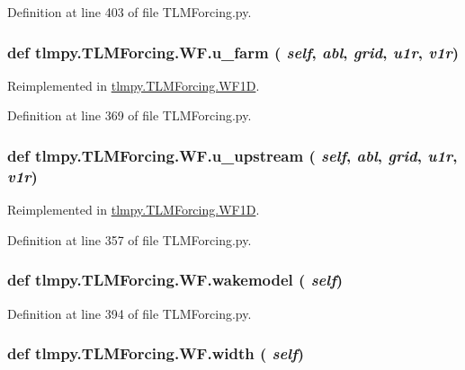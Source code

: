 Definition at line 403 of file TLMForcing.py.\hypertarget{classtlmpy_1_1TLMForcing_1_1WF_adba4afad5d7b012ddfc60ea21735d029}{
\subsubsection[{u\_\-farm}]{\setlength{\rightskip}{0pt plus 5cm}def tlmpy.TLMForcing.WF.u\_\-farm ( {\em self}, \/   {\em abl}, \/   {\em grid}, \/   {\em u1r}, \/   {\em v1r})}}
\label{classtlmpy_1_1TLMForcing_1_1WF_adba4afad5d7b012ddfc60ea21735d029}


Reimplemented in \hyperlink{classtlmpy_1_1TLMForcing_1_1WF1D_a540d7bd2116f611b0e169591b7efb75c}{tlmpy.TLMForcing.WF1D}.

Definition at line 369 of file TLMForcing.py.\hypertarget{classtlmpy_1_1TLMForcing_1_1WF_a6b3eacb0cfe133cc07990e9c9c43cf84}{
\subsubsection[{u\_\-upstream}]{\setlength{\rightskip}{0pt plus 5cm}def tlmpy.TLMForcing.WF.u\_\-upstream ( {\em self}, \/   {\em abl}, \/   {\em grid}, \/   {\em u1r}, \/   {\em v1r})}}
\label{classtlmpy_1_1TLMForcing_1_1WF_a6b3eacb0cfe133cc07990e9c9c43cf84}


Reimplemented in \hyperlink{classtlmpy_1_1TLMForcing_1_1WF1D_ad4e412ca5f03d828796ace1834caabcb}{tlmpy.TLMForcing.WF1D}.

Definition at line 357 of file TLMForcing.py.\hypertarget{classtlmpy_1_1TLMForcing_1_1WF_a867027f1ff1e2c5d26a4fe7fb04c8ebc}{
\subsubsection[{wakemodel}]{\setlength{\rightskip}{0pt plus 5cm}def tlmpy.TLMForcing.WF.wakemodel ( {\em self})}}
\label{classtlmpy_1_1TLMForcing_1_1WF_a867027f1ff1e2c5d26a4fe7fb04c8ebc}


Definition at line 394 of file TLMForcing.py.\hypertarget{classtlmpy_1_1TLMForcing_1_1WF_a04be28e8498f924b11ea9c18c04e4801}{
\subsubsection[{width}]{\setlength{\rightskip}{0pt plus 5cm}def tlmpy.TLMForcing.WF.width ( {\em self})}}
\label{classtlmpy_1_1TLMForcing_1_1WF_a04be28e8498f924b11ea9c18c04e4801}


